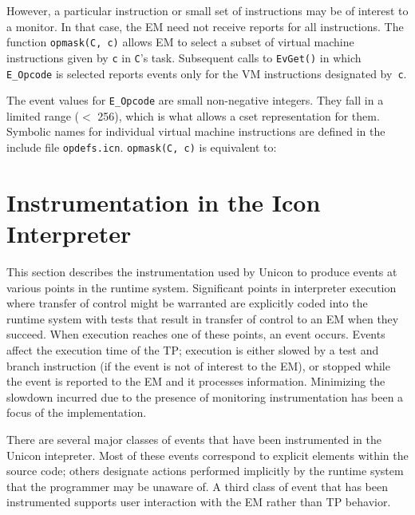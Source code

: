 However, a particular instruction or small set of instructions
may be of interest to a monitor.  In that case, the EM need not
receive reports for all instructions.  The function {\tt opmask(C, c)}
allows EM to select a subset of virtual machine instructions given by
{\tt c} in {\tt C}'s task.  Subsequent calls to {\tt EvGet()} in
which {\tt E\_Opcode} is selected reports events only for the VM
instructions designated by~{\tt c}.

The event values for {\tt E\_Opcode} are small non-negative integers.  They
fall in a limited range ($<$ 256), which is what allows a cset
representation for them.  Symbolic names for individual virtual machine
instructions are defined in the include file {\tt opdefs.icn}.
{\tt opmask(C, c)} is equivalent to:

{}
\vspace{-1.5pc}

\section{Instrumentation in the Icon Interpreter}

This section describes the instrumentation used by Unicon to produce
events at various points in the runtime system.  Significant points in
interpreter execution where transfer of control might be warranted are
explicitly coded into the runtime system with tests that result in
transfer of control to an EM when they succeed.  When execution reaches
one of these points, an event occurs.  Events affect the execution
time of the TP; execution is either slowed by a test and branch
instruction (if the event is not of interest to the EM), or stopped
while the event is reported to the EM and it processes information.
Minimizing the slowdown incurred due to the presence of monitoring
instrumentation has been a focus of the implementation.

There are several major classes of events that have been instrumented
in the Unicon intepreter.  Most of these events correspond to explicit
elements within the source code; others designate actions performed
implicitly by the runtime system that the programmer may be unaware of.
A third class of event that has been instrumented supports user
interaction with the EM rather than TP behavior.


